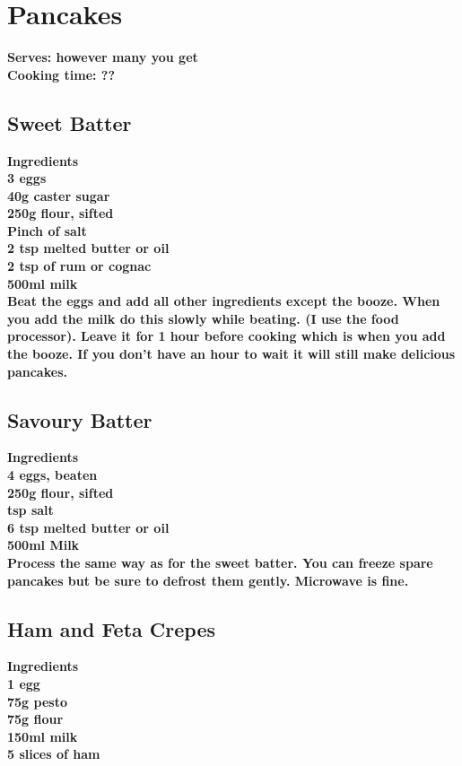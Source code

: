 \documentclass[18pt, oneside]{book}
\begin{document}
\section{Pancakes}

\bf{Serves: however many you get} \\
\bf{Cooking time: ??} \\ 

\subsection{Sweet Batter}
\bf{Ingredients} \normalfont \\
3 eggs \\
40g caster sugar \\
250g flour, sifted \\
Pinch of salt \\
2 tsp melted butter or oil \\
2 tsp of rum or cognac \\
500ml milk \\

Beat the eggs and add all other ingredients except the booze. When you add the milk do this slowly while beating. (I use the food processor). Leave it for 1 hour before cooking which is when you add the booze. If you don’t have an hour to wait it will still make delicious pancakes.
 
\subsection{Savoury Batter}
\bf{Ingredients} \normalfont \\
4 eggs, beaten \\
250g flour, sifted \\
 tsp salt \\
6 tsp melted butter or oil \\
500ml Milk \\

Process the same way as for the sweet batter.  You can freeze spare pancakes but be sure to defrost them gently. Microwave is fine.

\subsection{Ham and Feta Crepes}

\bf{Ingredients} \normalfont \\
1 egg \\
75g pesto \\
75g flour \\
150ml milk \\
5 slices of ham \\
\end{document}
